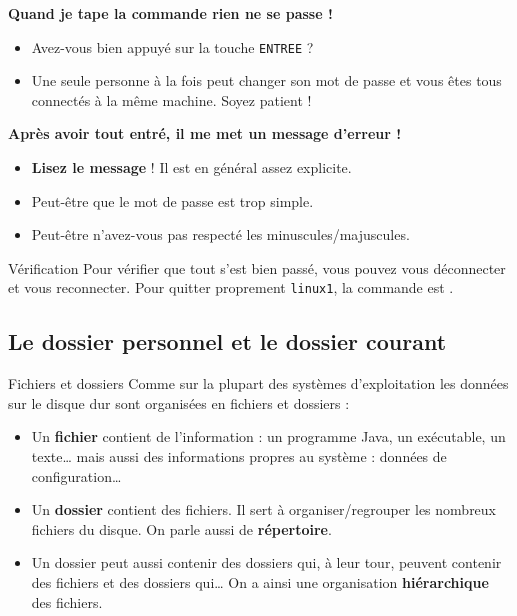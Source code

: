 \documentclass[a4paper,11pt]{style-esi/td}
\begin{document}
		\begin{faq}
			\textbf{Quand je tape la commande rien ne se passe !}
			\begin{itemize}				
			\item 
				Avez-vous bien appuyé sur la touche \texttt{ENTREE} ?
			\item 
				Une seule personne à la fois peut changer son mot de passe 
				et vous êtes tous connectés à la même machine. 
				Soyez patient !
			\end{itemize}	
			\textbf{Après avoir tout entré, il me met un message d'erreur !}
			\begin{itemize}
			\item \textbf{Lisez le message} ! Il est en général assez explicite.
			\item Peut-être que le mot de passe est trop simple.
			\item Peut-être n'avez-vous pas respecté les minuscules/majuscules.
			\end{itemize}
		\end{faq}
				
		\begin{Tutoriel}{Vérification} 
			Pour vérifier que tout s'est bien passé, 
			vous pouvez vous déconnecter et vous reconnecter.
			Pour quitter proprement \verb_linux1_, 
			la commande est .
		\end{Tutoriel}

	\subsection{Le dossier personnel et le dossier courant}

		\begin{theorie}{Fichiers et dossiers}
			Comme sur la plupart des systèmes d'exploitation 
			les données sur le disque dur 
			sont organisées en fichiers et dossiers :
			\begin{itemize}
			\item 
				Un \textbf{fichier} contient de l'information : 
				un programme Java, un exécutable, un texte\dots{}
				mais aussi des informations propres au système : 
				données de configuration\dots
			\item 
				Un \textbf{dossier} contient des fichiers. 
				Il sert à organiser/regrouper les nombreux fichiers du disque. 
				On parle aussi de \textbf{répertoire}.
			\item 
				Un dossier peut aussi contenir des dossiers qui, à leur tour, 
				peuvent contenir des fichiers et des dossiers qui\dots{}
				On a ainsi une organisation \textbf{hiérarchique} des fichiers.
			\end{itemize}
		\end{theorie}
\end{document}
